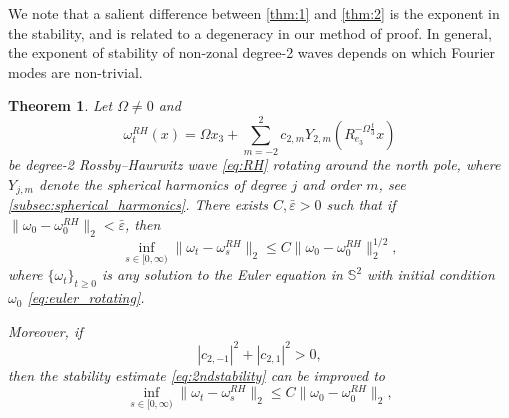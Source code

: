 \documentclass{amsart}
\newtheorem{theorem}{Theorem}[lemma]
\newtheorem{theorem}[lemma]{Theorem}  %
\def\esse{{\mathbb{S}}}
\def\eps{{\varepsilon}}
\begin{document}
We note that a salient difference between \cref{thm:1} and \cref{thm:2} is the exponent in the stability, and is related to a degeneracy in our method of proof. In general, the exponent of stability of non-zonal degree-2 waves depends on which Fourier modes are non-trivial.
\begin{theorem}\label{thm:main}
    Let $\Omega\ne 0$ and
    \begin{equation*}
        \omega^{RH}_t(x)=\Omega x_3 +\sum_{m=-2}^2c_{2,m} Y_{2,m}\left(R_{e_3}^{-\Omega\frac{t}{3}}x\right)
    \end{equation*} be degree-2 Rossby--Haurwitz wave \eqref{eq:RH} rotating around the north pole, where $Y_{j,m}$ denote the spherical harmonics of degree $j$ and order $m$, see \cref{subsec:spherical_harmonics}. There exists $C, \bar\eps>0$ such that if $\|\omega_0-\omega_0^{RH}\|_2<\bar\eps$, then
    \begin{equation}\label{eq:2ndstability}
        \inf_{s\in[0,\infty)}\|\omega_t-\omega_s^{RH}\|_2\leq C  \|\omega_0-\omega_0^{RH}\|_2^{1/2},
    \end{equation}
    where $\{\omega_t\}_{t\ge 0}$ is any solution to the Euler equation in $\esse^2$ with initial condition $\omega_0$ \eqref{eq:euler_rotating}.

    Moreover, if
    \begin{equation*}
        |c_{2,-1}|^2+|c_{2,1}|^2>0,
    \end{equation*}
    then the stability estimate \eqref{eq:2ndstability} can be improved to
    \begin{equation}
        \inf_{s\in[0,\infty)}\|\omega_t-\omega_s^{RH}\|_2\leq C  \|\omega_0-\omega_0^{RH}\|_2,
    \end{equation}
\end{theorem}
\end{document}
